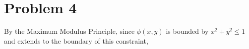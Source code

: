 \documentclass[a4paper, titlepage, DIV=14]{scrartcl}
\begin{document}
    \section*{Problem 4}
      By the Maximum Modulus Principle, since $\phi(x,y)$ is bounded by $x^{2}+y^{2}\leq1$ and extends to the boundary of this constraint,  
\end{document}

